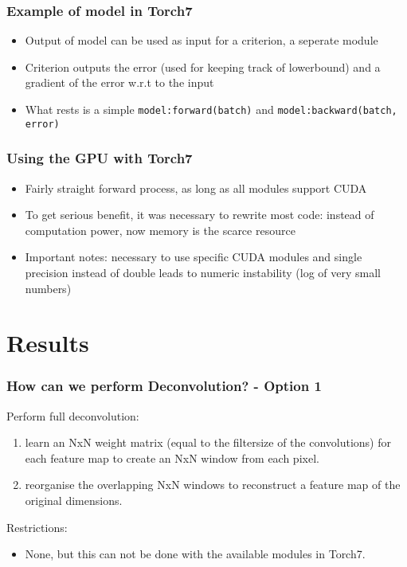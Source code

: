 \documentclass{beamer}
\begin{document}
\begin{frame}
\frametitle{Example of model in Torch7}

\begin{itemize}
	\item Output of model can be used as input for a criterion, a seperate module
	\item Criterion outputs the error (used for keeping track of lowerbound) and a gradient of the error w.r.t to the input
	\item What rests is a simple \texttt{model:forward(batch)} and \texttt{model:backward(batch, error)}
\end{itemize}

\end{frame}

\begin{frame}
\frametitle{Using the GPU with Torch7}

\begin{itemize}
	\item Fairly straight forward process, as long as all modules support CUDA
	\item To get serious benefit, it was necessary to rewrite most code: instead of computation power, now memory is the scarce resource
	\item Important notes: necessary to use specific CUDA modules and single precision instead of double leads to numeric instability (log of very small numbers)
\end{itemize}

\end{frame}

 
\section{Results}

\begin{frame}
\frametitle{How can we perform Deconvolution? - Option 1}
Perform full deconvolution: 
\begin{enumerate}
\item learn an NxN weight matrix (equal to the filtersize of the convolutions) for each feature map to create an NxN window from each pixel. 
\item reorganise the overlapping NxN windows to reconstruct a feature map of the original dimensions.
\end{enumerate}
Restrictions:
\begin{itemize}
\item None, but this can not be done with the available modules in Torch7.
\end{itemize} 
\end{frame}
\end{document}

